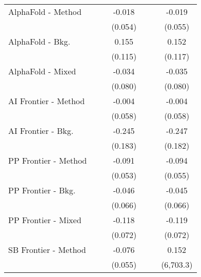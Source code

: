 \begin{tabular}{lcccccc}
   AlphaFold - Method           &               &         & -0.018      &               &         & -0.019\\   
                                &               &         & (0.054)     &               &         & (0.055)\\   
   AlphaFold - Bkg.             &               &         & 0.155       &               &         & 0.152\\   
                                &               &         & (0.115)     &               &         & (0.117)\\   
   AlphaFold - Mixed            &               &         & -0.034      &               &         & -0.035\\   
                                &               &         & (0.080)     &               &         & (0.080)\\   
   AI Frontier - Method         &               &         & -0.004      &               &         & -0.004\\   
                                &               &         & (0.058)     &               &         & (0.058)\\   
   AI Frontier - Bkg.           &               &         & -0.245      &               &         & -0.247\\   
                                &               &         & (0.183)     &               &         & (0.182)\\   
   PP Frontier - Method         &               &         & -0.091      &               &         & -0.094\\   
                                &               &         & (0.053)     &               &         & (0.055)\\   
   PP Frontier - Bkg.           &               &         & -0.046      &               &         & -0.045\\   
                                &               &         & (0.066)     &               &         & (0.066)\\   
   PP Frontier - Mixed          &               &         & -0.118      &               &         & -0.119\\   
                                &               &         & (0.072)     &               &         & (0.072)\\   
   SB Frontier - Method         &               &         & -0.076      &               &         & 0.152\\   
                                &               &         & (0.055)     &               &         & (6,703.3)\\   

\end{tabular}
